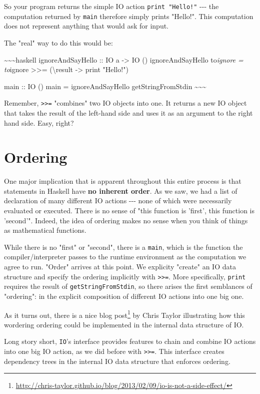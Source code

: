 \documentclass[]{article}
\renewcommand{\href}[2]{#2\footnote{\url{#1}}}
\begin{document}
So your program returns the simple IO action \texttt{print\ "Hello!"} -\/-\/-
the computation returned by \texttt{main} therefore simply prints "Hello!". This
computation does not represent anything that would ask for input.

The "real" way to do this would be:

\textasciitilde{}\textasciitilde{}\textasciitilde{}haskell ignoreAndSayHello ::
IO a -\textgreater{} IO () ignoreAndSayHello to\emph{ignore = to}ignore
\textgreater{}\textgreater{}= (\textbackslash{}result -\textgreater{} print
"Hello!")

main :: IO () main = ignoreAndSayHello getStringFromStdin
\textasciitilde{}\textasciitilde{}\textasciitilde{}

Remember, \texttt{\textgreater{}\textgreater{}=} "combines" two IO objects into
one. It returns a new IO object that takes the result of the left-hand side and
uses it as an argument to the right hand side. Easy, right?

\section{Ordering}

One major implication that is apparent throughout this entire process is that
statements in Haskell have \textbf{no inherent order}. As we saw, we had a list
of declaration of many different IO actions -\/-\/- none of which were
necessarily evaluated or executed. There is no sense of "this function is
'first', this function is 'second'". Indeed, the idea of ordering makes no sense
when you think of things as mathematical functions.

While there is no "first" or "second", there is a \texttt{main}, which is the
function the compiler/interpreter passes to the runtime environment as the
computation we agree to run. "Order" arrives at this point. We explicity
"create" an IO data structure and specify the ordering implicitly with
\texttt{\textgreater{}\textgreater{}=}. More specifically, \texttt{print}
requires the result of \texttt{getStringFromStdin}, so there arises the first
semblances of "ordering": in the explicit composition of different IO actions
into one big one.

As it turns out, there is a
\href{http://chris-taylor.github.io/blog/2013/02/09/io-is-not-a-side-effect/}{nice
blog post} by Chris Taylor illustrating how this wordering ordering could be
implemented in the internal data structure of IO.

Long story short, \texttt{IO}'s interface provides features to chain and combine
IO actions into one big IO action, as we did before with
\texttt{\textgreater{}\textgreater{}=}. This interface creates dependency trees
in the internal IO data structure that enforces ordering.
\end{document}
